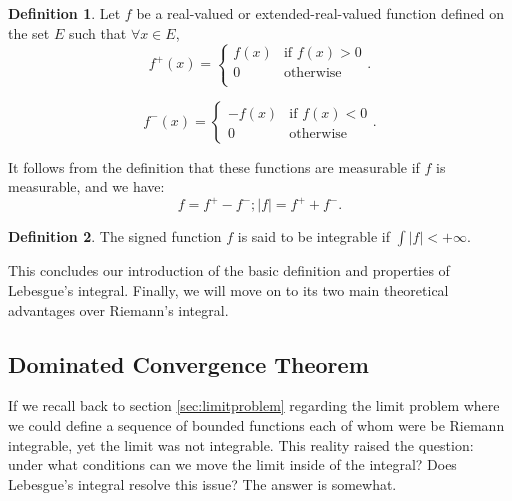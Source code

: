 \documentclass{article}
\theoremstyle{axiom} \newtheorem{axiom}{Axiom}
\theoremstyle{definition} \newtheorem{definition}{Definition}
\theoremstyle{example} \newtheorem{example}{Example}
\theoremstyle{proposition} \newtheorem{prop}{Proposition}
\theoremstyle{lemma} \newtheorem{lemma}{Lemma}
\begin{document}
\begin{definition}
Let $f$ be a real-valued or extended-real-valued function defined on
the set $E$ such that $\forall x \in E$, 
\begin{equation}
	f^+(x) = \begin{cases}
		f(x) & \text{if $f(x) > 0$} \\
		0 & \text{otherwise} \\
	\end{cases}.
\end{equation}

\begin{equation}
	f^-(x) = \begin{cases}
		-f(x) & \text{if $f(x) < 0$}\\
		0 & \text{otherwise}
	\end{cases}.
\end{equation}
\end{definition}
It follows from the definition that these functions are measurable if $f$ is 
measurable, and we have:
\begin{equation}
	f = f^+ - f^-;	|f| = f^+ + f^-.
\end{equation}

\begin{definition}
	The signed function $f$ is said to be integrable if $\int |f| < +\infty$.
\end{definition}

This concludes our introduction of the basic definition and properties 
of Lebesgue's integral. Finally, we will move on to its two main theoretical
advantages over Riemann's integral.

\subsection{Dominated Convergence Theorem}

If we recall back to section \ref{sec:limitproblem} regarding the limit 
problem where we could define a sequence of bounded functions each of whom were
be Riemann integrable, yet the limit was not integrable. This reality raised 
the question: under what conditions can we move the limit inside of the
integral? Does Lebesgue's integral resolve this issue? The answer is somewhat.
\end{document}
